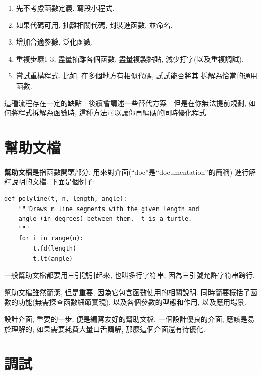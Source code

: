 \documentclass[10pt]{book}
\begin{document}
\begin{enumerate}

\item 先不考慮函數定義, 寫段小程式.

\item 如果代碼可用, 抽離相關代碼, 封裝進函數, 並命名.

\item 增加合適參數, 泛化函數.

\item 重複步驟1-3, 盡量抽離各個函數, 盡量複製黏貼, 減少打字(以及重複調試).

\item 嘗試重構程式. 比如, 在多個地方有相似代碼, 試試能否將其
拆解為恰當的通用函數.

\end{enumerate}

這種流程存在一定的缺點---後續會講述一些替代方案---但是在你無法提前規劃, 
如何將程式拆解為函數時, 這種方法可以讓你再編碼的同時優化程式. 

\section{幫助文檔}
\label{docstring}
{\bf 幫助文檔}是指函數開頭部分, 用來對介面(``doc''是``documentation''的簡稱)
進行解釋說明的文檔. 下面是個例子:

\begin{verbatim}
def polyline(t, n, length, angle):
    """Draws n line segments with the given length and
    angle (in degrees) between them.  t is a turtle.
    """    
    for i in range(n):
        t.fd(length)
        t.lt(angle)
\end{verbatim}
%
一般幫助文檔都要用三引號引起來, 也叫多行字符串, 
因為三引號允許字符串跨行. 

幫助文檔雖然簡潔, 但是重要, 因為它包含函數使用的相關說明. 
同時簡要概括了函數的功能(無需探查函數細節實現), 
以及各個參數的型態和作用, 以及應用場景. 

設計介面, 重要的一步, 便是編寫友好的幫助文檔. 
一個設計優良的介面, 應該是易於理解的;
如果需要耗費大量口舌講解, 那麼這個介面還有待優化. 


\section{調試}
\end{document}
